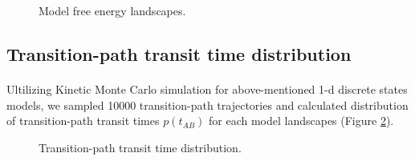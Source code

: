 \documentclass[11pt, a4paper]{article}
\begin{document}
\begin{figure}[htp]
  \noindent{}
  \caption{Model free energy landscapes.}
  \label{fig:FEL}
\end{figure}

\subsection{Transition-path transit time distribution}

\paragraph{}Ultilizing Kinetic Monte Carlo simulation for above-mentioned 1-d discrete states models, we sampled 10000
 transition-path trajectories and calculated distribution of transition-path transit times $p(t_{AB})$ for each model landscapes (Figure \ref{fig:tpt_time}).

\begin{figure}[htp]
  \noindent{}
  \caption{Transition-path transit time distribution.}
  \label{fig:tpt_time}
\end{figure}
\end{document}
